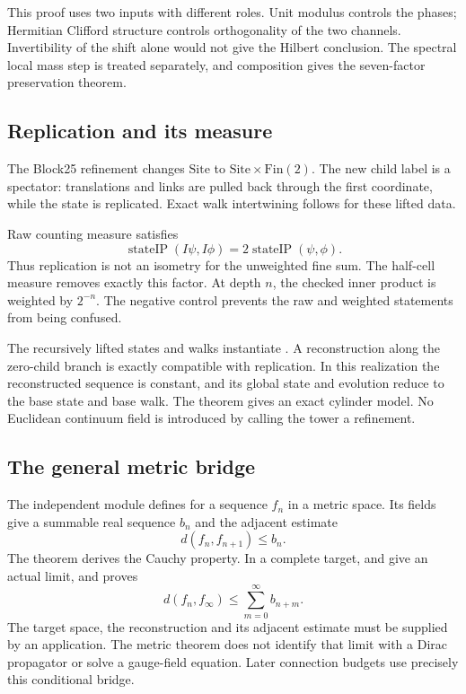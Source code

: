 This proof uses two inputs with different roles. Unit modulus controls the phases; Hermitian Clifford structure controls orthogonality of the two channels. Invertibility of the shift alone would not give the Hilbert conclusion. The spectral local mass step is treated separately, and composition gives the seven-factor preservation theorem.

\subsection{Replication and its measure}

The Block25 refinement changes \(\mathrm{Site}\) to \(\mathrm{Site}\times\mathrm{Fin}(2)\). The new child label is a spectator: translations and links are pulled back through the first coordinate, while the state is replicated. Exact walk intertwining follows for these lifted data.

Raw counting measure satisfies
\[
 \operatorname{stateIP}(I\psi,I\phi)
 =2\operatorname{stateIP}(\psi,\phi).
\]
Thus replication is not an isometry for the unweighted fine sum. The half-cell measure removes exactly this factor. At depth \(n\), the checked inner product is weighted by \(2^{-n}\). The negative control  prevents the raw and weighted statements from being confused.

The recursively lifted states and walks instantiate . A reconstruction along the zero-child branch is exactly compatible with replication. In this realization the reconstructed sequence is constant, and its global state and evolution reduce to the base state and base walk. The theorem gives an exact cylinder model. No Euclidean continuum field is introduced by calling the tower a refinement.

\subsection{The general metric bridge}

The independent module  defines  for a sequence \(f_n\) in a metric space. Its fields give a summable real sequence \(b_n\) and the adjacent estimate
\[
 d(f_n,f_{n+1})\le b_n.
\]
The theorem  derives the Cauchy property. In a complete target,  and  give an actual limit, and  proves
\[
 d(f_n,f_\infty)\le\sum_{m=0}^{\infty}b_{n+m}.
\]
The target space, the reconstruction and its adjacent estimate must be supplied by an application. The metric theorem does not identify that limit with a Dirac propagator or solve a gauge-field equation. Later connection budgets use precisely this conditional bridge.


